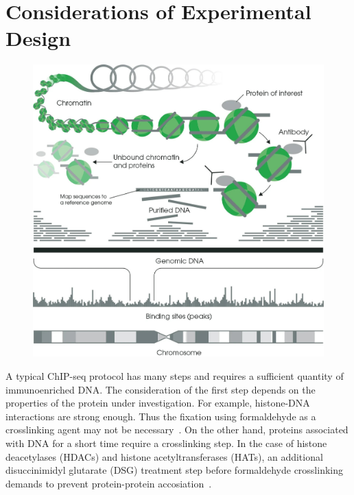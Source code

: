 





\section{Considerations of Experimental Design}

\begin{figure}[b!]
    \centering
    \includegraphics[width=\textwidth]{../img/chip.jpeg}
    \label{fig:graph_classes}
\end{figure}

A typical ChIP-seq protocol has many steps and requires a sufficient quantity of immunoenriched DNA. 
The consideration of the first step depends on the properties of the protein under investigation. 
For example, histone-DNA interactions are strong enough. 
Thus the fixation using formaldehyde as a crosslinking agent may not be necessary~\cite{barski2008identification}. 
On the other hand, proteins associated with DNA for a short time require a crosslinking step. 
In the case of histone deacetylases (HDACs) and histone acetyltransferases (HATs), an additional disuccinimidyl glutarate (DSG) treatment step before formaldehyde crosslinking demands to prevent protein-protein accosiation~\cite{wang2009genome}. 


